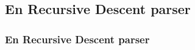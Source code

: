 \subsection{En Recursive Descent parser}
\begin{frame}
  \frametitle{En Recursive Descent parser}


\end{frame}
